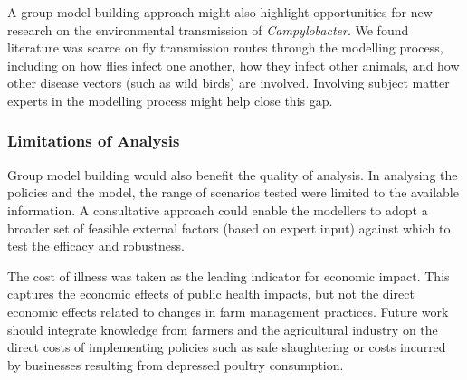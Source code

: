 A group model building approach might also highlight opportunities for new research on the environmental transmission of \textit{Campylobacter}. We found literature was scarce on fly transmission routes through the modelling process, including on how flies infect one another, how they infect other animals, and how other disease vectors (such as wild birds) are involved. Involving subject matter experts in the modelling process might help close this gap.

\subsubsection{Limitations of Analysis}
Group model building would also benefit the quality of analysis. In analysing the policies and the model, the range of scenarios tested were limited to the available information. A consultative approach could enable the modellers to adopt a broader set of feasible external factors (based on expert input) against which to test the efficacy and robustness.

The cost of illness was taken as the leading indicator for economic impact. This captures the economic effects of public health impacts, but not the direct economic effects related to changes in farm management practices. Future work should integrate knowledge from farmers and the agricultural industry on the direct costs of implementing policies such as safe slaughtering or costs incurred by businesses resulting from depressed poultry consumption.


